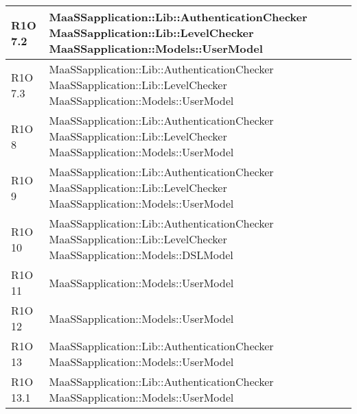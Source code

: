 \begin{center}
\begin{longtable}{ | l | p{8cm} |}
	R1O 7.2 & MaaSSapplication::Lib::AuthenticationChecker \newline MaaSSapplication::Lib::LevelChecker \newline  MaaSSapplication::Models::UserModel  \newline  \\ \hline
	
	R1O 7.3 & MaaSSapplication::Lib::AuthenticationChecker \newline MaaSSapplication::Lib::LevelChecker \newline  MaaSSapplication::Models::UserModel  \newline  \\ \hline

	R1O 8 & MaaSSapplication::Lib::AuthenticationChecker \newline MaaSSapplication::Lib::LevelChecker \newline   MaaSSapplication::Models::UserModel \newline  \\ \hline
	
	R1O 9 & MaaSSapplication::Lib::AuthenticationChecker \newline MaaSSapplication::Lib::LevelChecker \newline   MaaSSapplication::Models::UserModel \newline  \\ \hline
	
    R1O 10 & MaaSSapplication::Lib::AuthenticationChecker \newline MaaSSapplication::Lib::LevelChecker \newline   MaaSSapplication::Models::DSLModel \newline  \\ \hline
    
    R1O 11 & MaaSSapplication::Models::UserModel \newline  \\ \hline
	
	R1O 12 & MaaSSapplication::Models::UserModel  \newline  \\ \hline
	
	R1O 13 & MaaSSapplication::Lib::AuthenticationChecker \newline  MaaSSapplication::Models::UserModel \newline  \\ \hline
	
	R1O 13.1 & MaaSSapplication::Lib::AuthenticationChecker \newline MaaSSapplication::Models::UserModel  \newline  \\ \hline
	

\end{longtable}
\end{center}
